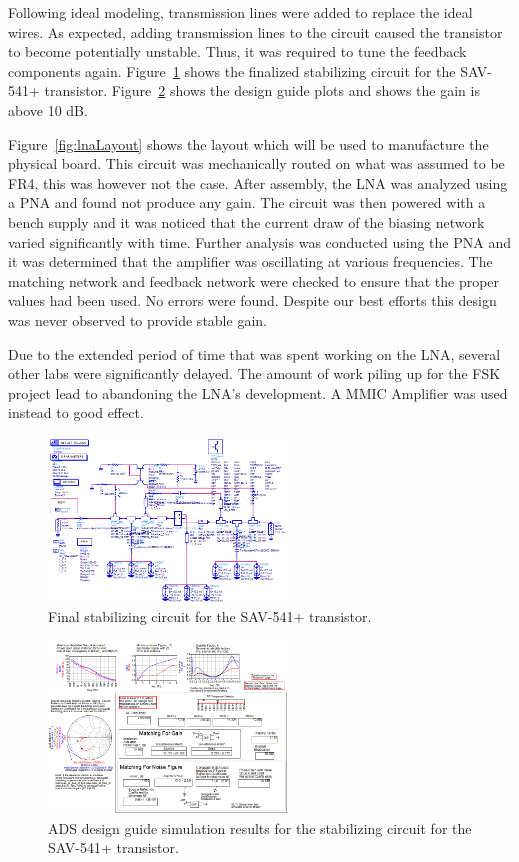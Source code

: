\documentclass[conference]{IEEEtran}
\begin{document}
Following ideal modeling, transmission lines were added to replace the ideal wires. As expected, adding transmission lines to the circuit caused the transistor to become potentially unstable. Thus, it was required to tune the feedback components again. Figure~\ref{fig:finalstabcircuit} shows the finalized stabilizing circuit for the SAV-541+ transistor. Figure~\ref{fig:finalstabsimulation} shows the design guide plots and shows the gain is above 10 dB.

Figure~\ref{fig:lnaLayout} shows the layout which will be used to manufacture the physical board.  This circuit was mechanically routed on what was assumed to be FR4, this was however not the case. After assembly, the LNA was analyzed using a PNA and found not produce any gain. The circuit was then powered with a bench supply and it was noticed that the current draw of the biasing network varied significantly with time. Further analysis was conducted using the PNA and it was determined that the amplifier was oscillating at various frequencies. The matching network and feedback network were checked to ensure that the proper values had been used. No errors were found. Despite our best efforts this design was never observed to provide stable gain.

Due to the extended period of time that was spent working on the LNA, several other labs were significantly delayed. The amount of work piling up for the FSK project lead to abandoning the LNA's development. A MMIC Amplifier was used instead to good effect. 

\begin{figure}[!h]
\centering
\includegraphics[width=2.5in]{pics/FinalStabilizingCircuit.png}
\caption{Final stabilizing circuit for the SAV-541+ transistor.}
\label{fig:finalstabcircuit}
\end{figure}

\begin{figure}[!h]
\centering
\includegraphics[width=2.5in]{pics/FinalStabilizingSimulation.png}
\caption{ADS design guide simulation results for the stabilizing circuit for the SAV-541+ transistor.}
\label{fig:finalstabsimulation}
\end{figure}
\end{document}
